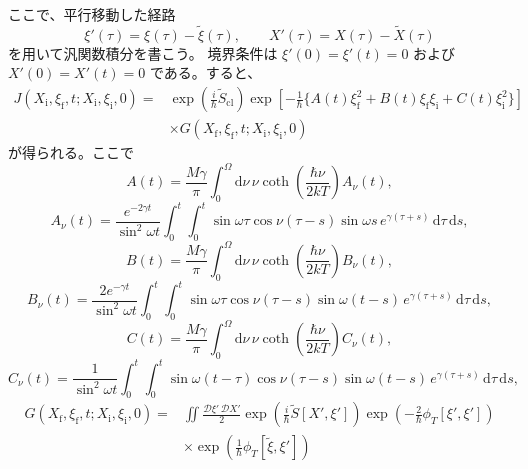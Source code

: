 ここで、平行移動した経路
\begin{equation}
\xi'(\tau)=\xi(\tau)-\tilde\xi(\tau),\qquad
X'(\tau)=X(\tau)-\tilde X(\tau)
\tag{6.14}\label{eq:6.14}
\end{equation}
を用いて汎関数積分を書こう。
境界条件は $\xi'(0)=\xi'(t)=0$ および $X'(0)=X'(t)=0$ である。すると、
\begin{equation}
\begin{aligned}
J(X_{\mathrm i},\xi_{\mathrm f},t;X_{\mathrm i},\xi_{\mathrm i},0)
={}&\exp\!\left(\frac{i}{\hbar}\tilde S_{\mathrm{cl}}\right)
\exp\!\left[-\frac1\hbar\{A(t)\xi_{\mathrm f}^2
+B(t)\xi_{\mathrm f}\xi_{\mathrm i}+C(t)\xi_{\mathrm i}^2\}\right]\\
&\times G(X_{\mathrm f},\xi_{\mathrm f},t;X_{\mathrm i},\xi_{\mathrm i},0)
\end{aligned}
\tag{6.15}\label{eq:6.15}
\end{equation}
が得られる。ここで
\begin{equation}
A(t)=\frac{M\gamma}{\pi}\int_0^\Omega
\mathrm d\nu\,\nu\coth\!\left(\frac{\hbar\nu}{2kT}\right)A_\nu(t),
\tag{6.16}\label{eq:6.16}
\end{equation}
\begin{equation}
A_\nu(t)=\frac{e^{-2\gamma t}}{\sin^2\omega t}
\int_0^t\int_0^t\sin\omega\tau\cos\nu(\tau-s)\sin\omega s\,
e^{\gamma(\tau+s)}\,\mathrm d\tau\,\mathrm ds,
\tag{6.17}\label{eq:6.17}
\end{equation}
\begin{equation}
B(t)=\frac{M\gamma}{\pi}\int_0^\Omega
\mathrm d\nu\,\nu\coth\!\left(\frac{\hbar\nu}{2kT}\right)B_\nu(t),
\tag{6.18}\label{eq:6.18}
\end{equation}
\begin{equation}
B_\nu(t)=\frac{2e^{-\gamma t}}{\sin^2\omega t}
\int_0^t\int_0^t\sin\omega\tau\cos\nu(\tau-s)\sin\omega(t-s)\,
e^{\gamma(\tau+s)}\,\mathrm d\tau\,\mathrm ds,
\tag{6.19}\label{eq:6.19}
\end{equation}
\begin{equation}
C(t)=\frac{M\gamma}{\pi}\int_0^\Omega
\mathrm d\nu\,\nu\coth\!\left(\frac{\hbar\nu}{2kT}\right)C_\nu(t),
\tag{6.20}\label{eq:6.20}
\end{equation}
\begin{equation}
C_\nu(t)=\frac1{\sin^2\omega t}
\int_0^t\int_0^t\sin\omega(t-\tau)\cos\nu(\tau-s)\sin\omega(t-s)\,
e^{\gamma(\tau+s)}\,\mathrm d\tau\,\mathrm ds,
\tag{6.21}\label{eq:6.21}
\end{equation}
\begin{equation}
\begin{aligned}
G(X_{\mathrm f},\xi_{\mathrm f},t;X_{\mathrm i},\xi_{\mathrm i},0)
={}&\iint\frac{\mathcal D\xi'\,\mathcal DX'}2
\exp\!\left(\frac{i}{\hbar}\tilde S[X',\xi']\right)
\exp\!\left(-\frac2\hbar\phi_T[\xi',\xi']\right)\\
&\times\exp\!\left(\frac1\hbar\phi_T[\tilde\xi,\xi']\right)
\end{aligned}
\tag{6.22}\label{eq:6.22}
\end{equation}
